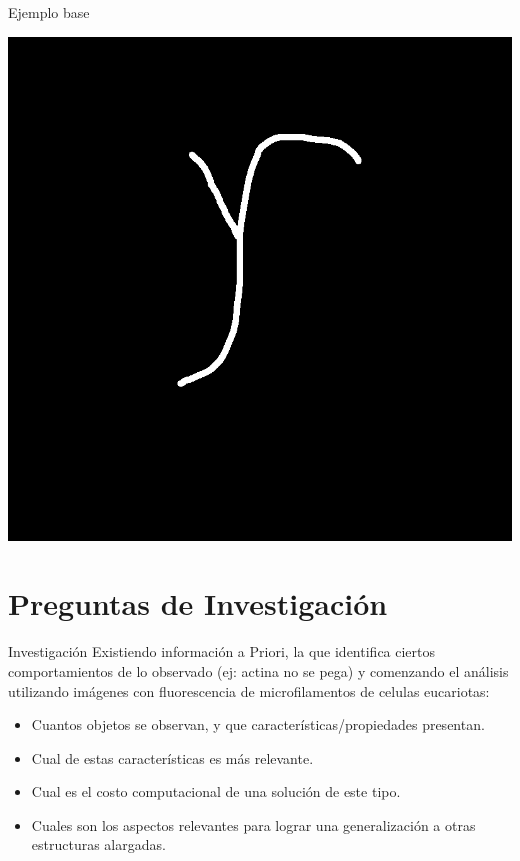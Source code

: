 \documentclass[10pt]{beamer}
\begin{document}
\begin{frame}[fragile]{Ejemplo base}
\begin{center}
    \includegraphics[width=\textwidth,height=0.5\textheight]{test.png}
        \end{center}
\end{frame}

\section{Preguntas de Investigaci\'on}

\begin{frame}{Investigaci\'on}
	Existiendo información a Priori, la que identifica ciertos comportamientos de lo observado (ej: actina no se pega) y comenzando el an\'alisis utilizando im\'agenes con fluorescencia de microfilamentos de celulas eucariotas:
	\begin{itemize}
		\item Cuantos objetos se observan, y que caracter\'isticas/propiedades presentan.
		\item Cual de estas caracter\'isticas es m\'as relevante.
		\item Cual es el costo computacional de una soluci\'on de este tipo.
		\item Cuales son los aspectos relevantes para lograr una generalizaci\'on a otras estructuras alargadas.
	\end{itemize}
\end{frame}
\end{document}
